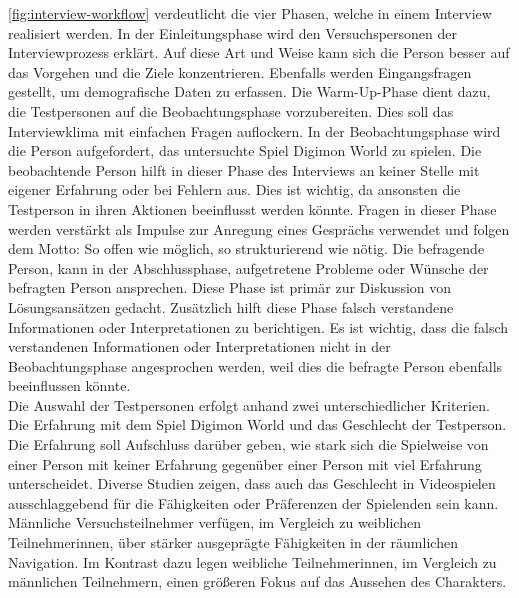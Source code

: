 \autoref{fig:interview-workflow} verdeutlicht die vier Phasen, welche in einem Interview realisiert werden.
In der Einleitungsphase wird den Versuchspersonen der Interviewprozess erklärt.
Auf diese Art und Weise kann sich die Person besser auf das Vorgehen und die Ziele konzentrieren.
Ebenfalls werden Eingangsfragen gestellt, um demografische Daten zu erfassen.
Die Warm-Up-Phase dient dazu, die Testpersonen auf die Beobachtungsphase vorzubereiten.
Dies soll das Interviewklima mit einfachen Fragen auflockern\cite{methods-of-data-collection}.
In der Beobachtungsphase wird die Person aufgefordert, das untersuchte Spiel Digimon World zu spielen.
Die beobachtende Person hilft in dieser Phase des Interviews an keiner Stelle mit eigener Erfahrung oder bei Fehlern aus.
Dies ist wichtig, da ansonsten die Testperson in ihren Aktionen beeinflusst werden könnte.
Fragen in dieser Phase werden verstärkt als Impulse zur Anregung eines Gesprächs verwendet und folgen dem Motto: \glqq So offen wie möglich, so strukturierend wie nötig\grqq{}\cite[S. 563]{handbuch-methoden-der-empirischen-sozialforschung}\cite[S. 126]{methoden-in-der-naturwissenschaft}.
Die befragende Person, kann in der Abschlussphase, aufgetretene Probleme oder Wünsche der befragten Person ansprechen.
Diese Phase ist primär zur Diskussion von Lösungsansätzen gedacht.
Zusätzlich hilft diese Phase falsch verstandene Informationen oder Interpretationen zu berichtigen.
Es ist wichtig, dass die falsch verstandenen Informationen oder Interpretationen nicht in der Beobachtungsphase angesprochen werden, weil dies die befragte Person ebenfalls beeinflussen könnte.\\

Die Auswahl der Testpersonen erfolgt anhand zwei unterschiedlicher Kriterien.
Die Erfahrung mit dem Spiel Digimon World und das Geschlecht der Testperson.
Die Erfahrung soll Aufschluss darüber geben, wie stark sich die Spielweise von einer Person mit keiner Erfahrung gegenüber einer Person mit viel Erfahrung unterscheidet.
Diverse Studien zeigen, dass auch das Geschlecht in Videospielen ausschlaggebend für die Fähigkeiten oder Präferenzen der Spielenden sein kann.
Männliche Versuchsteilnehmer verfügen, im Vergleich zu weiblichen Teilnehmerinnen, über stärker ausgeprägte Fähigkeiten in der räumlichen Navigation\cite{gender-maze}\cite{gender-shopping}.
Im Kontrast dazu legen weibliche Teilnehmerinnen, im Vergleich zu männlichen Teilnehmern, einen größeren Fokus auf das Aussehen des Charakters\cite{gender-items-in-mmo}\cite{gender-clothes}.\\

